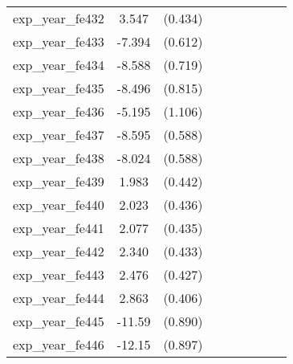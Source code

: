 {\begin{tabular}{l*{4}{cc}}
exp\_year\_fe432&    3.547\sym{***}&  (0.434)&                  &         &                  &         &                  &         \\
exp\_year\_fe433&   -7.394\sym{***}&  (0.612)&                  &         &                  &         &                  &         \\
exp\_year\_fe434&   -8.588\sym{***}&  (0.719)&                  &         &                  &         &                  &         \\
exp\_year\_fe435&   -8.496\sym{***}&  (0.815)&                  &         &                  &         &                  &         \\
exp\_year\_fe436&   -5.195\sym{***}&  (1.106)&                  &         &                  &         &                  &         \\
exp\_year\_fe437&   -8.595\sym{***}&  (0.588)&                  &         &                  &         &                  &         \\
exp\_year\_fe438&   -8.024\sym{***}&  (0.588)&                  &         &                  &         &                  &         \\
exp\_year\_fe439&    1.983\sym{***}&  (0.442)&                  &         &                  &         &                  &         \\
exp\_year\_fe440&    2.023\sym{***}&  (0.436)&                  &         &                  &         &                  &         \\
exp\_year\_fe441&    2.077\sym{***}&  (0.435)&                  &         &                  &         &                  &         \\
exp\_year\_fe442&    2.340\sym{***}&  (0.433)&                  &         &                  &         &                  &         \\
exp\_year\_fe443&    2.476\sym{***}&  (0.427)&                  &         &                  &         &                  &         \\
exp\_year\_fe444&    2.863\sym{***}&  (0.406)&                  &         &                  &         &                  &         \\
exp\_year\_fe445&   -11.59\sym{***}&  (0.890)&                  &         &                  &         &                  &         \\
exp\_year\_fe446&   -12.15\sym{***}&  (0.897)&                  &         &                  &         &                  &         \\

\end{tabular}}
